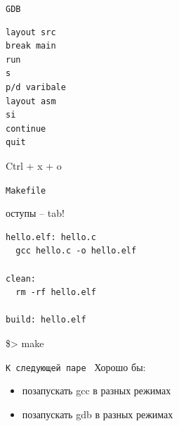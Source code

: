 \documentclass[pdf, 10pt, unicode]{beamer}
\begin{document}
\begin{frame}[fragile]{{\tt GDB }}
\begin{verbatim}
layout src
break main
run
s
p/d varibale
layout asm
si
continue
quit
\end{verbatim}
Ctrl + x + o
\end{frame}

\begin{frame}[fragile]{{\tt Makefile }}

оступы -- tab!
\begin{verbatim}
hello.elf: hello.c
  gcc hello.c -o hello.elf

clean:
  rm -rf hello.elf

build: hello.elf
\end{verbatim}
\$> make

\end{frame}

\begin{frame}[fragile]{{\tt К следующей паре }}
  Хорошо бы:
  \begin{itemize}
    \item позапускать gcc в разных режимах
    \item позапускать gdb в разных режимах
  \end{itemize}
\end{frame}
\end{document}
